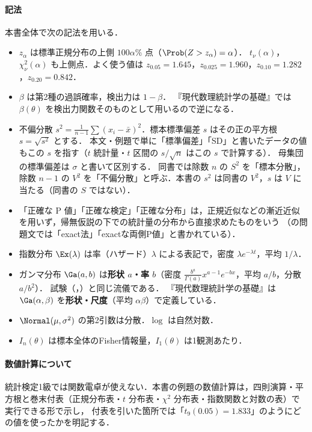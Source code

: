 \paragraph{記法}
本書全体で次の記法を用いる．
\begin{itemize}
\item $z_\alpha$ は標準正規分布の上側 $100\alpha\%$ 点（$\Prob(Z>z_\alpha)=\alpha$）．
      $t_\nu(\alpha)$，$\chi^2_\nu(\alpha)$ も上側点．よく使う値は $z_{0.05}=1.645$，$z_{0.025}=1.960$，$z_{0.10}=1.282$，$z_{0.20}=0.842$．
\item $\beta$ は第2種の過誤確率，検出力は $1-\beta$．
      \Youchui 『現代数理統計学の基礎』では $\beta(\theta)$ を検出力関数そのものとして用いるので逆になる．
\item 不偏分散 $s^2=\frac{1}{n-1}\sum(x_i-\bar x)^2$．標本標準偏差 $s$ はその正の平方根 $s=\sqrt{s^2}$ とする．
      本文・例題で単に「標準偏差」「SD」と書いたデータの値もこの $s$ を指す（$t$ 統計量・$t$ 区間の $s/\sqrt n$ はこの $s$ で計算する）．
      母集団の標準偏差は $\sigma$ と書いて区別する．
      \Youchui 同書では除数 $n$ の $S^2$ を「標本分散」，除数 $n-1$ の $V^2$ を「不偏分散」と呼ぶ．本書の $s^2$ は同書の $V^2$，$s$ は $V$ に当たる（同書の $S$ ではない）．
\item 「正確な P 値」「正確な検定」「正確な分布」は，正規近似などの漸近近似を用いず，帰無仮説の下での統計量の分布から直接求めたものをいう
      （の問題文では「exact法」「exactな両側P値」と書かれている）．
\item 指数分布 $\Ex(\lambda)$ は率（ハザード）$\lambda$ による表記で，密度 $\lambda e^{-\lambda t}$，平均 $1/\lambda$．
\item ガンマ分布 $\Ga(a,b)$ は\textbf{形状 $a$・率 $b$}（密度 $\frac{b^a}{\Gamma(a)}x^{a-1}e^{-bx}$，平均 $a/b$，分散 $a/b^2$）．
      試験（，）と同じ流儀である．
      \Youchui 『現代数理統計学の基礎』は $\Ga(\alpha,\beta)$ を\textbf{形状・尺度}（平均 $\alpha\beta$）で定義している．
\item $\Normal(\mu,\sigma^2)$ の第2引数は分散．$\log$ は自然対数．
\item $I_n(\theta)$ は標本全体のFisher情報量，$I_1(\theta)$ は1観測あたり．
\end{itemize}

\enlargethispage{2\baselineskip}
\paragraph{数値計算について}
統計検定1級では関数電卓が使えない．本書の例題の数値計算は，四則演算・平方根と巻末付表（正規分布表・$t$ 分布表・$\chi^2$ 分布表・指数関数と対数の表）で実行できる形で示し，
付表を引いた箇所では「$t_9(0.05)=1.833$」のようにどの値を使ったかを明記する．

